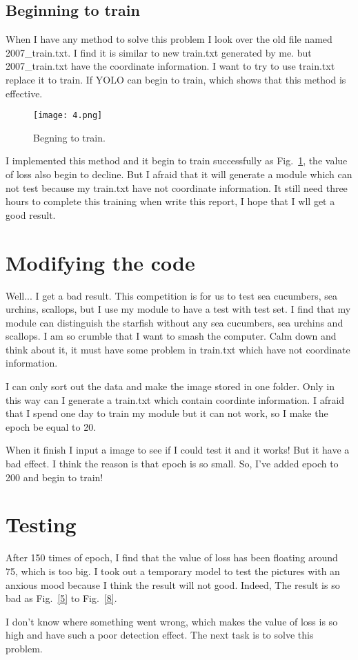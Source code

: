 \documentclass[a4paper]{article}
\begin{document}
\subsection{Beginning to train \cite{note1}}
When I have any method to solve this problem I look over the old file named 2007\_train.txt. I find it is similar to new train.txt generated by me. but 2007\_train.txt have the coordinate information. I want to try to use train.txt replace it to train. If YOLO can begin to train, which shows that this method is effective. 
\begin{figure}[h]
	\begin{center}
		\texttt{[image: 4.png]}\\
		\caption{Begning to train.}\label{4}
	\end{center}
\end{figure}
\par
I implemented this method and it begin to train successfully as Fig.~\ref{4}, the value of loss also begin to  decline. But I afraid that it will generate a module which can not test because my train.txt have not coordinate information. It still need three hours to complete this training when write this report, I hope that I wll get a good result.
\par
\section{Modifying the code}
Well... I get a bad result. This competition is for us to test sea cucumbers, sea urchins, scallops, but I use my module to have a test with test set. I find that my module can distinguish the starfish without any sea cucumbers, sea urchins and scallops. I am so crumble that I want to smash the computer. Calm down and think about it, it must have some problem in train.txt which have not coordinate information.
\par
 I can only sort out the data and make the image stored in one folder. Only in this way can I generate a train.txt which contain coordinte information. I afraid that I spend one day to train my module but it can not work, so I make the epoch be equal to 20. 
 \par 
 When it finish I input a image to see if I could test it and it works! But it have a bad effect. I think the reason is that epoch is so small. So, I've added epoch to 200 and begin to train!
\section{Testing}
After 150 times of epoch, I find that the value of loss has been floating around 75, which is too big. I took out a temporary model to test the pictures with an anxious mood because I think the result will not good. Indeed, The result is so bad as Fig.~\ref{5} to Fig.~\ref{8}.
\par
I don't know where something went wrong, which makes the value of loss is so high and have such a poor detection effect. The next task is to solve this problem.
\end{document}
